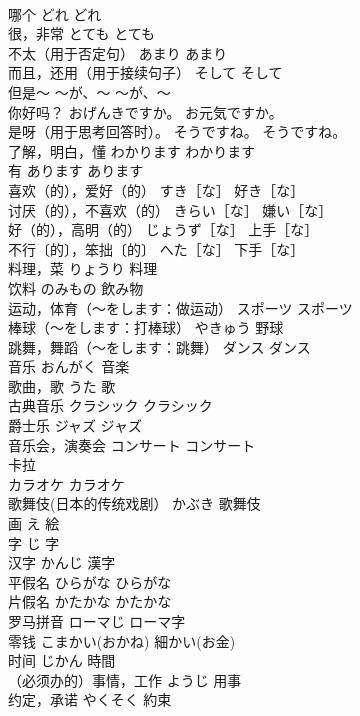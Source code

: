 \documentclass[8pt]{extreport}
\begin{document}
\begin{CJK}{UTF8}{min}
\\	哪个	どれ	どれ
\\	很，非常	とても	とても
\\	不太（用于否定句）	あまり	あまり
\\	而且，还用（用于接续句子）	そして	そして
\\	但是～	～が、～	～が、～
\\	你好吗？	おげんきですか。	お元気ですか。
\\	是呀（用于思考回答时）。	そうですね。	そうですね。
\\	了解，明白，懂	わかります	わかります
\\	有	あります	あります
\\	喜欢（的），爱好（的）	すき［な］	好き［な］
\\	讨厌（的），不喜欢（的）	きらい［な］	嫌い［な］
\\	好（的），高明（的）	じょうず［な］	上手［な］
\\	不行〔的〕，笨拙〔的〕	へた［な］	下手［な］
\\	料理，菜	りょうり	料理
\\	饮料	のみもの	飲み物
\\	运动，体育（～をします：做运动）	スポーツ	スポーツ
\\	棒球（～をします：打棒球）	やきゅう	野球
\\	跳舞，舞蹈（～をします：跳舞）	ダンス	ダンス
\\	音乐	おんがく	音楽
\\	歌曲，歌	うた	歌
\\	古典音乐	クラシック	クラシック
\\	爵士乐	ジャズ	ジャズ
\\	音乐会，演奏会	コンサート	コンサート
\\	卡拉
\\	カラオケ	カラオケ
\\	歌舞伎(日本的传统戏剧）	かぶき	歌舞伎
\\	画	え	絵
\\	字	じ	字
\\	汉字	かんじ	漢字
\\	平假名	ひらがな	ひらがな
\\	片假名	かたかな	かたかな
\\	罗马拼音	ローマじ	ローマ字
\\	零钱	こまかい(おかね)	細かい(お金)
\\	时间	じかん	時間
\\	（必须办的）事情，工作	ようじ	用事
\\	约定，承诺	やくそく	約束

\end{CJK}
\end{document}
